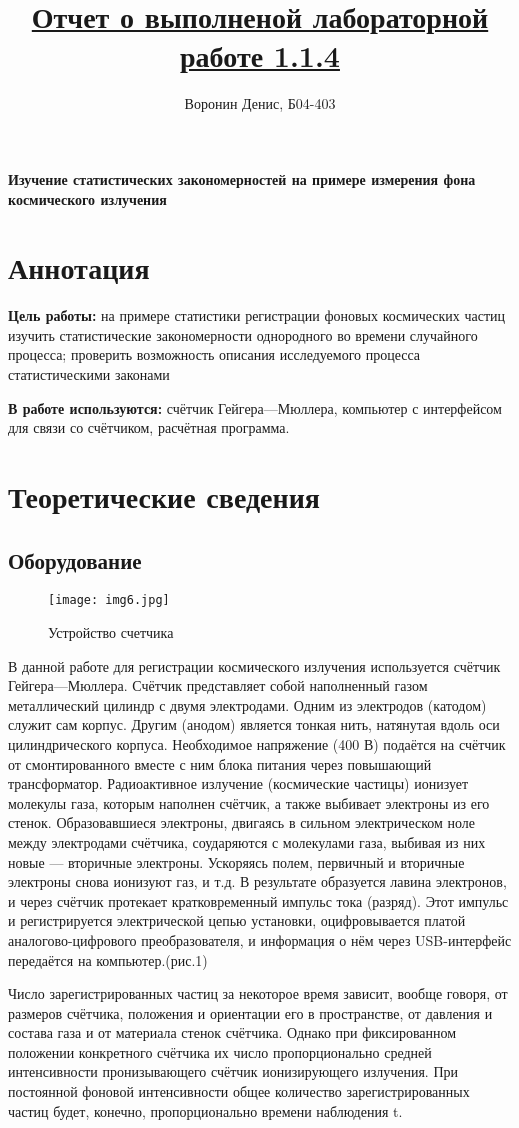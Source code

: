 \documentclass[a4paper]{article}
\title{\underline{Отчет о выполненой лабораторной работе 1.1.4}}
\author{Воронин Денис, Б04-403}
\begin{document}
\maketitle
\textbf{Изучение статистических
закономерностей на примере измерения
фона космического излучения}

\section{Аннотация}
\textbf{Цель работы:} на примере статистики регистрации фоновых космических частиц изучить статистические закономерности однородного во времени случайного процесса;
проверить возможность описания исследуемого процесса статистическими законами 

\textbf{В работе используются:} счётчик Гейгера—Мюллера, компьютер с интерфейсом для 
связи со счётчиком, расчётная программа.


\section{Теоретические сведения}
\subsection{Оборудование}

\begin{wrapfigure}{R}{.3\textwidth}
\centering
\texttt{[image: img6.jpg]}
\caption{Устройство счетчика}
\end{wrapfigure}

В данной работе для регистрации космического излучения используется счётчик Гейгера—Мюллера. Счётчик представляет собой наполненный газом металлический цилиндр с двумя электродами. Одним из электродов (катодом) служит сам корпус. Другим (анодом) является тонкая нить, натянутая вдоль оси цилиндрического корпуса. Необходимое напряжение (400 В) подаётся на счётчик от смонтированного вместе с ним блока питания через повышающий трансформатор. Радиоактивное излучение (космические частицы) ионизует молекулы газа, которым наполнен счётчик, а также выбивает электроны из его стенок. Образовавшиеся электроны, двигаясь в сильном электрическом ноле между электродами счётчика, соударяются с молекулами газа, выбивая из них новые — вторичные электроны. Ускоряясь полем, первичный и вторичные электроны снова ионизуют газ, и т.д. В результате образуется лавина электронов, и через счётчик протекает кратковременный импульс тока (разряд). Этот импульс и регистрируется электрической цепью установки, оцифровывается платой аналогово-цифрового преобразователя, и информация о нём через USB-интерфейс передаётся на компьютер.(рис.1) \par
Число зарегистрированных частиц за некоторое время зависит, вообще говоря, от размеров счётчика, положения и ориентации его в пространстве, от давления и состава газа и от материала стенок счётчика. Однако при фиксированном положении конкретного счётчика их число пропорционально 
средней интенсивности пронизывающего счётчик ионизирующего излучения. При постоянной фоновой интенсивности общее количество зарегистрированных частиц будет, конечно, пропорционально времени наблюдения t.
\end{document}
